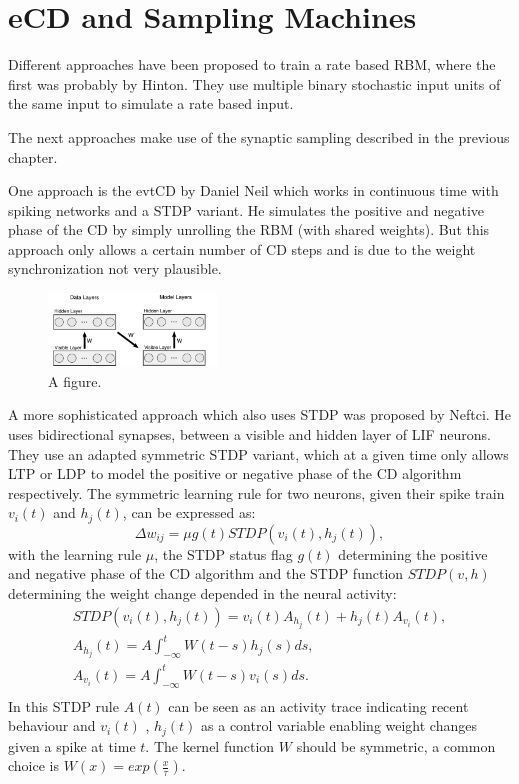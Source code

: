 \section{eCD and Sampling Machines}

Different approaches have been proposed to train a rate based RBM, where the first was probably by Hinton.
They use multiple binary stochastic input units of the same input to simulate a rate based input.

The next approaches make use of the synaptic sampling described in the previous chapter.

One approach is the evtCD by Daniel Neil which works in continuous time with spiking networks and a STDP variant.
He simulates the positive and negative phase of the CD by simply unrolling the RBM (with shared weights). 
But this approach only allows a certain number of CD steps and is due to the weight synchronization not very plausible.

\begin{figure}
	\centering
    	\includegraphics[width=0.4\textwidth]{imgs/evtCD.png} 
    \caption{A figure.}
	\label{fig:test}
\end{figure}

A more sophisticated approach which also uses STDP was proposed by Neftci.
He uses bidirectional synapses, between a visible and hidden layer of LIF neurons.
They use an adapted symmetric STDP variant, which at a given time only allows LTP or LDP to model the positive or negative phase of the CD algorithm respectively. 
The symmetric learning rule for two neurons, given their spike train $v_i(t)$ and $h_j(t)$, can be expressed as:
\[
\Delta w_{ij} = \mu g(t) STDP(v_i(t), h_j(t)),
\]
with the learning rule $\mu$, the STDP status flag $g(t)$ determining the positive and negative phase of the CD algorithm and the STDP function $STDP(v, h)$ determining the weight change depended in the neural activity:
\[
\begin{split}
STDP(v_i(t), h_j(t)) = v_i(t) A_{h_j}(t) + h_j(t) A_{v_i}(t), \\
A_{h_j}(t) = A \int_{- \infty}^t W(t-s) h_j(s) ds, \\ 
A_{v_i}(t) = A \int_{- \infty}^t W(t-s) v_i(s) ds. \\ 
\end{split}
\]
In this STDP rule $A(t)$ can be seen as an activity trace indicating recent behaviour and $v_i(t)$ , $h_j(t)$ as a control variable enabling weight changes given a spike at time $t$.    
The kernel function $W$ should be symmetric, a common choice is $W(x) = exp(\frac{x}{\tau})$. 

